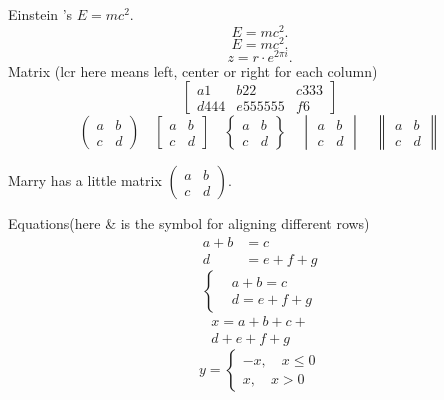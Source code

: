 \documentclass[11pt,a4paper,twocolumn]{article}
\begin{document}
Einstein 's $E=mc^2$. %
\[ E=mc^2. \] %
\begin{equation}
E=mc^2. %
\end{equation}
\[ z = r\cdot e^{2\pi i}. \]
  Matrix (lcr here means left, center or right for each column)
   \[
     \left[
       \begin{array}{lcr}
         a1 & b22 & c333 \\
         d444 & e555555 & f6
       \end{array}
     \right]
   \]
   \[ \begin{pmatrix} a&b\\c&d \end{pmatrix} \quad
   \begin{bmatrix} a&b\\c&d \end{bmatrix} \quad
   \begin{Bmatrix} a&b\\c&d \end{Bmatrix} \quad
   \begin{vmatrix} a&b\\c&d \end{vmatrix} \quad
   \begin{Vmatrix} a&b\\c&d \end{Vmatrix} \]

   Marry has a little matrix $ ( \begin{smallmatrix} a&b\\c&d \end{smallmatrix} ) $.

Equations(here \& is the symbol for aligning different rows)
\begin{align}
   a+b&=c\\
   d&=e+f+g
\end{align}
\[
   \left\{
     \begin{aligned}
       &a+b=c\\
       &d=e+f+g
     \end{aligned}
   \right.
\]
\begin{multline}
  x = a+b+c+{} \\
  d+e+f+g
  \end{multline}
\[ y= \begin{cases}
  -x,\quad x\leq 0 \\
  x,\quad x>0
  \end{cases} \]
\end{document}
